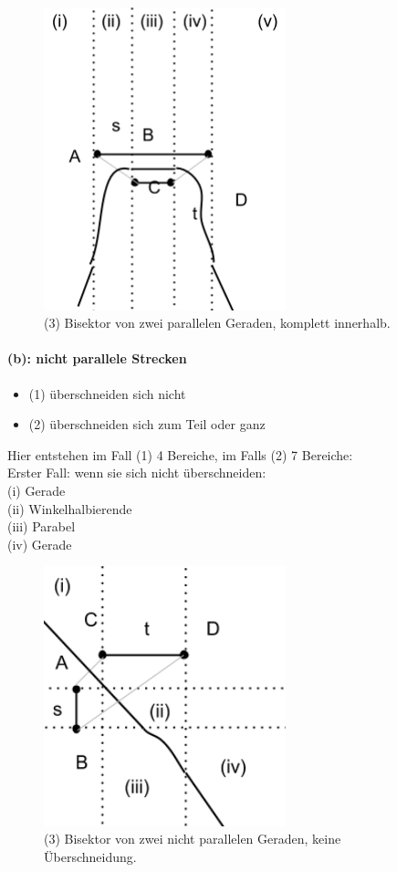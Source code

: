 \begin{figure}[h]
\begin{center}
\includegraphics[width=7cm]{img/ss4.png}
\end{center}
\caption{(3) Bisektor von zwei parallelen Geraden, komplett innerhalb.}
\label{fig:a4}
\end{figure}

\paragraph*{(b): nicht parallele Strecken}

\begin{itemize}
\item (1) überschneiden sich nicht
\item (2) überschneiden sich zum Teil oder ganz
\end{itemize}

Hier entstehen im Fall (1) 4 Bereiche, im Falls (2) 7 Bereiche:\\

Erster Fall: wenn sie sich nicht überschneiden:\\
(i) Gerade\\
(ii) Winkelhalbierende\\
(iii) Parabel\\
(iv) Gerade\\

\begin{figure}[h]
\begin{center}
\includegraphics[width=7cm]{img/ssnpout.png}
\end{center}
\caption{(3) Bisektor von zwei nicht parallelen Geraden, keine Überschneidung.}
\label{fig:a5}
\end{figure}

